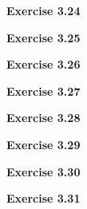 \documentclass{article}
\begin{document}
\bigskip

\begin{framed}
    \noindent \textbf{Exercise 3.24}
    
    \medskip
    
    
\end{framed}

\bigskip

\begin{framed}
    \noindent \textbf{Exercise 3.25}
    
    \medskip
    
    
\end{framed}

\bigskip

\begin{framed}
    \noindent \textbf{Exercise 3.26}
    
    \medskip
    
    
\end{framed}

\bigskip

\begin{framed}
    \noindent \textbf{Exercise 3.27}
    
    \medskip
    
    
\end{framed}

\bigskip

\begin{framed}
    \noindent \textbf{Exercise 3.28}
    
    \medskip
    
    
\end{framed}

\bigskip

\begin{framed}
    \noindent \textbf{Exercise 3.29}
    
    \medskip
    
    
\end{framed}

\bigskip

\begin{framed}
    \noindent \textbf{Exercise 3.30}
    
    \medskip
    
    
\end{framed}

\bigskip

\begin{framed}
    \noindent \textbf{Exercise 3.31}
    
    \medskip
    
    
\end{framed}
\end{document}
